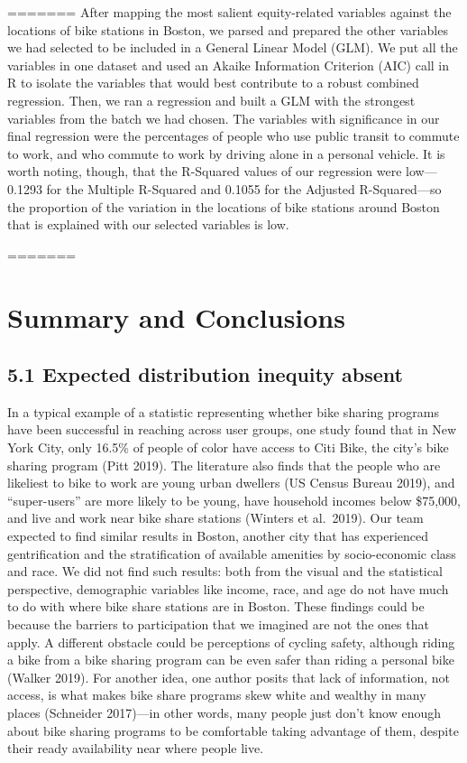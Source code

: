 \documentclass[
  12pt,
]{article}
\begin{document}
======= After mapping the most salient equity-related variables against
the locations of bike stations in Boston, we parsed and prepared the
other variables we had selected to be included in a General Linear Model
(GLM). We put all the variables in one dataset and used an Akaike
Information Criterion (AIC) call in R to isolate the variables that
would best contribute to a robust combined regression. Then, we ran a
regression and built a GLM with the strongest variables from the batch
we had chosen. The variables with significance in our final regression
were the percentages of people who use public transit to commute to
work, and who commute to work by driving alone in a personal vehicle. It
is worth noting, though, that the R-Squared values of our regression
were low---0.1293 for the Multiple R-Squared and 0.1055 for the Adjusted
R-Squared---so the proportion of the variation in the locations of bike
stations around Boston that is explained with our selected variables is
low.

======= \newpage

\hypertarget{summary-and-conclusions}{%
\section{Summary and Conclusions}\label{summary-and-conclusions}}

\hypertarget{expected-distribution-inequity-absent}{%
\subsection{5.1 Expected distribution inequity
absent}\label{expected-distribution-inequity-absent}}

In a typical example of a statistic representing whether bike sharing
programs have been successful in reaching across user groups, one study
found that in New York City, only 16.5\% of people of color have access
to Citi Bike, the city's bike sharing program (Pitt 2019). The
literature also finds that the people who are likeliest to bike to work
are young urban dwellers (US Census Bureau 2019), and ``super-users''
are more likely to be young, have household incomes below \$75,000, and
live and work near bike share stations (Winters et al.~2019). Our team
expected to find similar results in Boston, another city that has
experienced gentrification and the stratification of available amenities
by socio-economic class and race. We did not find such results: both
from the visual and the statistical perspective, demographic variables
like income, race, and age do not have much to do with where bike share
stations are in Boston. These findings could be because the barriers to
participation that we imagined are not the ones that apply. A different
obstacle could be perceptions of cycling safety, although riding a bike
from a bike sharing program can be even safer than riding a personal
bike (Walker 2019). For another idea, one author posits that lack of
information, not access, is what makes bike share programs skew white
and wealthy in many places (Schneider 2017)---in other words, many
people just don't know enough about bike sharing programs to be
comfortable taking advantage of them, despite their ready availability
near where people live.
\end{document}
